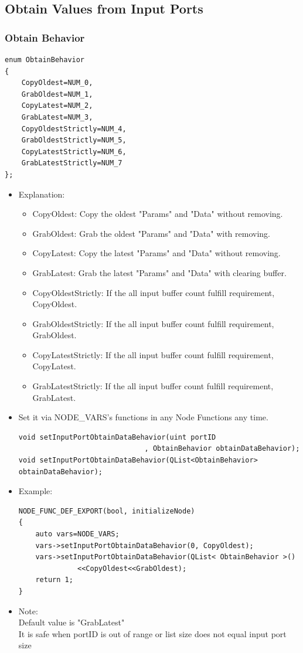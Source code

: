 \documentclass[a4paper,10pt]{book}
\begin{document}
\subsection{Obtain Values from Input Ports}

\subsubsection{Obtain Behavior}

\begin{mdframed}
\begin{verbatim}
enum ObtainBehavior
{
    CopyOldest=NUM_0,
    GrabOldest=NUM_1,
    CopyLatest=NUM_2,
    GrabLatest=NUM_3,
    CopyOldestStrictly=NUM_4,
    GrabOldestStrictly=NUM_5,
    CopyLatestStrictly=NUM_6,
    GrabLatestStrictly=NUM_7
};
\end{verbatim}
\begin{itemize}
 \item Explanation:
 \begin{itemize}
  \item CopyOldest: Copy the oldest "Params" and "Data" without removing.
  \item GrabOldest: Grab the oldest "Params" and "Data" with removing.
  \item CopyLatest: Copy the latest "Params" and "Data" without removing.
  \item GrabLatest: Grab the latest "Params" and "Data" with clearing buffer.
  \item CopyOldestStrictly: If the all input buffer count fulfill requirement, CopyOldest.
  \item GrabOldestStrictly: If the all input buffer count fulfill requirement, GrabOldest.
  \item CopyLatestStrictly: If the all input buffer count fulfill requirement, CopyLatest.
  \item GrabLatestStrictly: If the all input buffer count fulfill requirement, GrabLatest.
  \end{itemize}
  \item Set it via NODE\_VARS's functions in any Node Functions any time.
\begin{verbatim}
void setInputPortObtainDataBehavior(uint portID
                              , ObtainBehavior obtainDataBehavior);
void setInputPortObtainDataBehavior(QList<ObtainBehavior> obtainDataBehavior);
\end{verbatim}
  \item Example:
\begin{verbatim}
NODE_FUNC_DEF_EXPORT(bool, initializeNode)
{
    auto vars=NODE_VARS;
    vars->setInputPortObtainDataBehavior(0, CopyOldest);
    vars->setInputPortObtainDataBehavior(QList< ObtainBehavior >()
              <<CopyOldest<<GrabOldest);
    return 1;
}
\end{verbatim}
 \item Note: \\ Default value is "GrabLatest" \\ It is safe when portID is out of range or list size does not equal input port size
\end{itemize}
\end{mdframed}
\end{document}
